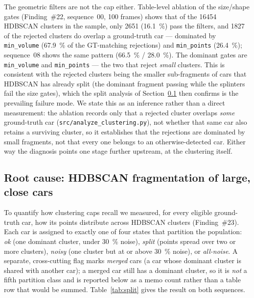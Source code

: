 The geometric filters are not the cap either. Table-level ablation of the
size/shape gates (Finding~\#22, sequence~00, \num{100} frames) shows that of the
\num{16454} HDBSCAN clusters in the sample, only \num{2651} (\SI{16.1}{\percent})
pass the filters, and \num{1827} of the rejected clusters do overlap a ground-truth
car --- dominated by \texttt{min\_volume} (\SI{67.9}{\percent} of the GT-matching
rejections) and \texttt{min\_points} (\SI{26.4}{\percent}); sequence~08 shows the
same pattern (\SI{66.5}{\percent} / \SI{28.0}{\percent}). The dominant gates are
\texttt{min\_volume} and \texttt{min\_points} --- the two that reject \emph{small}
clusters. This is consistent with the rejected clusters being the smaller
sub-fragments of cars that HDBSCAN has already split (the dominant fragment passing
while the splinters fail the size gates), which the split analysis of
Section~\ref{sec:split-analysis} then confirms is the prevailing failure mode. We
state this as an inference rather than a direct measurement: the ablation records
only that a rejected cluster overlaps \emph{some} ground-truth car
(\texttt{src/analyze\_clustering.py}), not whether that same car also retains a
surviving cluster, so it establishes that the rejections are dominated by small
fragments, not that every one belongs to an otherwise-detected car. Either way the
diagnosis points one stage further upstream, at the clustering itself.

\subsection{Root cause: HDBSCAN fragmentation of large, close cars}
\label{sec:split-analysis}

To quantify how clustering caps recall we measured, for every eligible ground-truth
car, how its points distribute across HDBSCAN clusters (Finding~\#23). Each car is
assigned to exactly one of four states that partition the population: \emph{ok} (one
dominant cluster, under \SI{30}{\percent} noise), \emph{split} (points spread over
two or more clusters), \emph{noisy} (one cluster but at or above \SI{30}{\percent}
noise), or \emph{all-noise}. A separate, cross-cutting flag marks \emph{merged} cars
(a car whose dominant cluster is shared with another car); a merged car still has a
dominant cluster, so it is \emph{not} a fifth partition class and is reported below
as a memo count rather than a table row that would be summed.
Table~\ref{tab:split} gives the result on both sequences.

